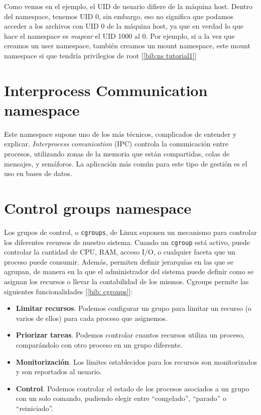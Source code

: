 \documentclass[a4paper, oneside, 12pt]{book}
\begin{document}
	\addvspace{20px}
	
	\par \noindent Como vemos en el ejemplo, el UID de usuario difiere de la máquina host. Dentro del namespace, tenemos UID 0, sin embargo, eso no significa que podamos acceder a los archivos con UID 0 de la máquina host, ya que en verdad lo que hace el namespace es \textit{mapear} el UID 1000 al 0. Por ejemplo, si a la vez que creamos un user namespace, también creamos un mount namespace, este mount namespace si que tendría privilegios de root [\ref{bib:ns tutorial1}]
	
	\section{Interprocess Communication namespace}
	\par \noindent Este namespace supone uno de los más técnicos, complicados de entender y explicar. \textit{Interprocess comunication} (IPC) controla la comunicación entre procesos, utilizando zonas de la memoria que están compartidas, colas de mensajes, y semáforos. La aplicación más común para este tipo de gestión es el uso en bases de datos.
	
	\pagebreak
	
	\section{Control groups namespace}
	\par \noindent Los grupos de control, o \texttt{cgroups}, de Linux suponen un mecanismo para controlar los diferentes recursos de nuestro sistema. Cuando un \texttt{cgroup} está activo, puede controlar la cantidad de CPU, RAM, acceso I/O, o cualquier faceta que un proceso puede consumir. Además, permiten definir jerarquías en las que se agrupan, de manera en la que el administrador del sistema puede definir como se asignan los recursos o llevar la contabilidad de los mismos. Cgroups permite las siguientes funcionalidades [\ref{bib: cgroups}]: 
	\begin{itemize}
		\item \textbf{Limitar recursos}. Podemos configurar un grupo para limitar un recurso (o varios de ellos) para cada proceso que asignemos.
		\item \textbf{Priorizar tareas}. Podemos controlar cuantos recursos utiliza un proceso, comparándolo con otro proceso en un grupo diferente.
		\item \textbf{Monitorización}. Los límites establecidos para los recursos son monitorizados y son reportados al usuario.
		\item \textbf{Control}. Podemos controlar el estado de los procesos asociados a un grupo con un solo comando, pudiendo elegir entre ``congelado'', ``parado'' o ``reiniciado''.
	\end{itemize}
	
\end{document}
